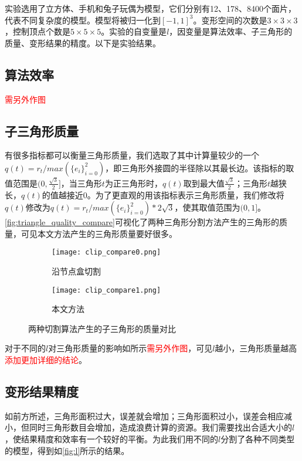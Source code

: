 实验选用了立方体、手机和兔子玩偶为模型，它们分别有12、178、8400个面片，代表不同复杂度的模型。模型将被归一化到$[-1, 1]^3$。变形空间的次数是$3\times3\times3$，控制顶点个数是$5\times5\times5$。实验的自变量是$l$，因变量是算法效率、子三角形的质量、变形结果的精度。以下是实验结果。


\subsection{算法效率}
\textcolor{red}{需另外作图}

\subsection{子三角形质量}
有很多指标都可以衡量三角形质量\cite{pebay2003}，我们选取了其中计算量较少的一个$q(t)=r_t/max(\{e_i\}^{2}_{i=0})$，即三角形外接圆的半径除以其最长边。该指标的取值范围是$(0, \frac{\sqrt{3}}{2}]$，当三角形$t$为正三角形时，$q(t)$取到最大值$\frac{\sqrt{3}}{2}$；三角形$t$越狭长，$q(t)$的值越接近0。为了更直观的用该指标表示三角形质量，我们修改将$q(t)$修改为$q(t)=r_t/max(\{e_i\}^{2}_{i=0})*2\sqrt{3}$，使其取值范围为$(0, 1]$。\autoref{fig:triangle_quality_compare}可视化了两种三角形分割方法产生的三角形的质量，可见本文方法产生的三角形质量要好很多。

\begin{figure}[htbp]
	\centering
	\begin{subfigure}[b]{.4\textwidth}
		\centering
		\texttt{[image: clip\_compare0.png]}
		\caption{沿节点盒切割}\label{subfig:clip_compare0}
	\end{subfigure}%
	\begin{subfigure}[b]{.4\textwidth}
		\centering
		\texttt{[image: clip\_compare1.png]}
		\caption{本文方法}\label{subfig:clip_compare1}
	\end{subfigure}
	\caption{两种切割算法产生的子三角形的质量对比}\label{fig:triangle_quality_compare}
\end{figure}

对于不同的$l$对三角形质量的影响如所示\textcolor{red}{需另外作图}，可见$l$越小，三角形质量越高\textcolor{red}{添加更加详细的结论}。

\subsection{变形结果精度}
如前方所述，三角形面积过大，误差就会增加；三角形面积过小，误差会相应减小，但同时三角形数目会增加，造成浪费计算的资源。我们需要找出合适大小的$l$，使结果精度和效率有一个较好的平衡。为此我们用不同的$l$分割了各种不同类型的模型，得到如\autoref{fig:l}所示的结果。

